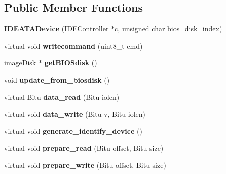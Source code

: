 \subsection*{Public Member Functions}
\begin{DoxyCompactItemize}
\item 
\hypertarget{classIDEATADevice_a25958c65c635e0ffe5829a6aef21263d}{{\bfseries I\-D\-E\-A\-T\-A\-Device} (\hyperlink{classIDEController}{I\-D\-E\-Controller} $\ast$c, unsigned char bios\-\_\-disk\-\_\-index)}\label{classIDEATADevice_a25958c65c635e0ffe5829a6aef21263d}

\item 
\hypertarget{classIDEATADevice_ae4122c663d2f3ccf138be4e3935f3958}{virtual void {\bfseries writecommand} (uint8\-\_\-t cmd)}\label{classIDEATADevice_ae4122c663d2f3ccf138be4e3935f3958}

\item 
\hypertarget{classIDEATADevice_a0156b7decf71ca4f5aff7bd71330bc89}{\hyperlink{classimageDisk}{image\-Disk} $\ast$ {\bfseries get\-B\-I\-O\-Sdisk} ()}\label{classIDEATADevice_a0156b7decf71ca4f5aff7bd71330bc89}

\item 
\hypertarget{classIDEATADevice_ade8754c3910543f79022ebbc7feaceb2}{void {\bfseries update\-\_\-from\-\_\-biosdisk} ()}\label{classIDEATADevice_ade8754c3910543f79022ebbc7feaceb2}

\item 
\hypertarget{classIDEATADevice_a4eba5d300ebb60afa9e4b2281d17046f}{virtual Bitu {\bfseries data\-\_\-read} (Bitu iolen)}\label{classIDEATADevice_a4eba5d300ebb60afa9e4b2281d17046f}

\item 
\hypertarget{classIDEATADevice_ab18ccdb74b1656aedbd5ae5c4ee6d99f}{virtual void {\bfseries data\-\_\-write} (Bitu v, Bitu iolen)}\label{classIDEATADevice_ab18ccdb74b1656aedbd5ae5c4ee6d99f}

\item 
\hypertarget{classIDEATADevice_add93ce0c1dfe93a0f69b33a901f798dd}{virtual void {\bfseries generate\-\_\-identify\-\_\-device} ()}\label{classIDEATADevice_add93ce0c1dfe93a0f69b33a901f798dd}

\item 
\hypertarget{classIDEATADevice_a99929bd6d6cc8f1dda50d16ff350443c}{virtual void {\bfseries prepare\-\_\-read} (Bitu offset, Bitu size)}\label{classIDEATADevice_a99929bd6d6cc8f1dda50d16ff350443c}

\item 
\hypertarget{classIDEATADevice_a56f2ed829312bfc5cb14b48be3c2d3f1}{virtual void {\bfseries prepare\-\_\-write} (Bitu offset, Bitu size)}\label{classIDEATADevice_a56f2ed829312bfc5cb14b48be3c2d3f1}


\end{DoxyCompactItemize}
